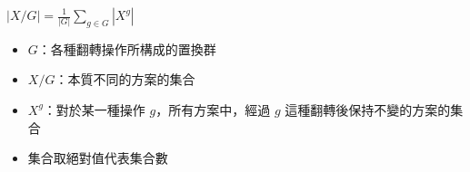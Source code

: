 $|X/G| = \frac{1}{|G|} \sum_{g\in G} |X^g|$
\begin{itemize}
	\item $G$：各種翻轉操作所構成的置換群
	\item $X/G$：本質不同的方案的集合
	\item $X^g$：對於某一種操作 $g$，所有方案中，經過 $g$ 這種翻轉後保持不變的方案的集合
	\item 集合取絕對值代表集合數
\end{itemize}